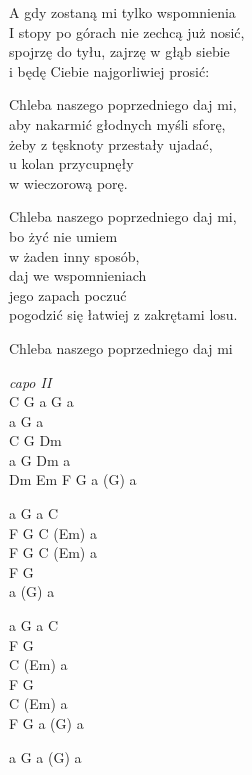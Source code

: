 \begin{text}
\hfill\break
\hfill\break
A gdy zostaną mi tylko wspomnienia\\
I stopy po górach nie zechcą już nosić,\\
spojrzę do tyłu, zajrzę w głąb siebie\\
i będę Ciebie najgorliwiej prosić:

Chleba naszego poprzedniego daj mi,\\
aby nakarmić głodnych myśli sforę,\\
żeby z tęsknoty przestały ujadać,\\
u kolan przycupnęły\\
w wieczorową porę.

Chleba naszego poprzedniego daj mi,\\
bo żyć nie umiem\\
w żaden inny sposób,\\
daj we wspomnieniach\\
jego zapach poczuć\\
pogodzić się łatwiej z zakrętami losu.

Chleba naszego poprzedniego daj mi\\
\end{text}
\begin{chord}
\textit{capo II}\\
C G a G a\\
a G a\\
C G Dm\\
a G Dm a\\
Dm Em F G a (G) a

a G a C\\
F G C (Em) a\\
F G C (Em) a\\
F G\\
a (G) a

a G a C\\
F G\\
C (Em) a\\
F G\\
C (Em) a\\
F G a (G) a

a G a (G) a
\end{chord}
